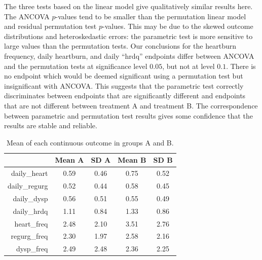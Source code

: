 \documentclass[12pt]{article}
\begin{document}
The three tests based on the linear model give qualitatively similar results here.
The ANCOVA $p$-values tend to be smaller than the permutation linear model and residual permutation test $p$-values.
This may be due to the skewed outcome distributions and heteroskedastic errors: the parametric test is more sensitive to large values than the permutation tests.
Our conclusions for the heartburn frequency, daily heartburn, and daily ``hrdq'' endpoints differ between ANCOVA and the permutation tests at significance level $0.05$, but not at level $0.1$.
There is no endpoint which would be deemed significant using a permutation test but insignificant with ANCOVA.
This suggests that the parametric test correctly discriminates between endpoints that are significantly different and endpoints that are not different between treatment A and treatment B.
The correspondence between parametric and permutation test results gives some confidence that the results are stable and reliable.


\begin{table}\label{tab:clinical_distr}
\centering
\begin{tabular}{r|cc|cc}
  \hline
 & Mean A & SD A & Mean B & SD B \\ 
  \hline
daily\_heart & 0.59 & 0.46 & 0.75 & 0.52 \\ 
  daily\_regurg & 0.52 & 0.44 & 0.58 & 0.45 \\ 
  daily\_dysp & 0.56 & 0.51 & 0.55 & 0.49 \\ 
  daily\_hrdq & 1.11 & 0.84 & 1.33 & 0.86 \\ 
  heart\_freq & 2.48 & 2.10 & 3.51 & 2.76 \\ 
  regurg\_freq & 2.30 & 1.97 & 2.58 & 2.16 \\ 
  dysp\_freq & 2.49 & 2.48 & 2.36 & 2.25 \\ 
   \hline
\end{tabular}
\caption{Mean of each continuous outcome in groups A and B.} 
\end{table}
\end{document}
